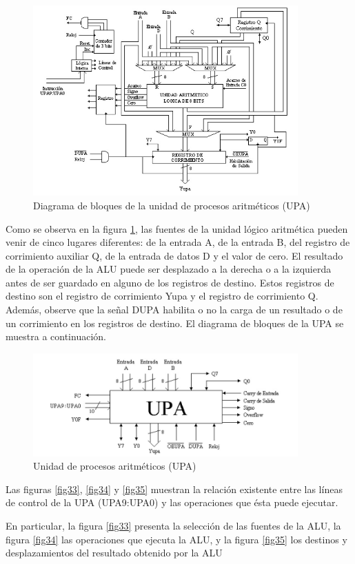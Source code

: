 \documentclass[12pt]{book}
\theoremstyle{definition}
\theoremstyle{remark}
\theoremstyle{plain}
\begin{document}
\begin{figure}
\centering
\includegraphics[width=4in]{ALU.jpg}
\caption{Diagrama de bloques de la unidad de procesos aritméticos (UPA)}
\label{fig31}
\end{figure}


Como se observa en la figura \ref{fig31}, las fuentes de la unidad lógico aritmética pueden venir de
cinco lugares diferentes: de la entrada A, de la entrada B, del registro de corrimiento auxiliar Q, de
la entrada de datos D y el valor de cero.
El resultado de la operación de la ALU puede ser desplazado a la derecha o a la izquierda antes
de ser guardado en alguno de los registros de destino. Estos registros de destino son el registro de
corrimiento Yupa y el registro de corrimiento Q. Además, observe que la señal DUPA habilita o no
la carga de un resultado o de un corrimiento en los registros de destino.
El diagrama de bloques de la UPA se muestra a continuación.


\begin{figure}
\centering
\includegraphics[width=4in]{ALU2.jpg}
\caption{Unidad de procesos aritméticos (UPA)}
\label{fig32}
\end{figure}

Las figuras \ref{fig33}, \ref{fig34} y \ref{fig35} muestran la relación existente entre las líneas de control de la UPA
(UPA9:UPA0) y las operaciones que ésta puede ejecutar.

En particular, la figura \ref{fig33} presenta la selección de las fuentes de la ALU, la figura \ref{fig34} las
operaciones que ejecuta la ALU, y la figura \ref{fig35} los destinos y desplazamientos del resultado
obtenido por la ALU
\end{document}
